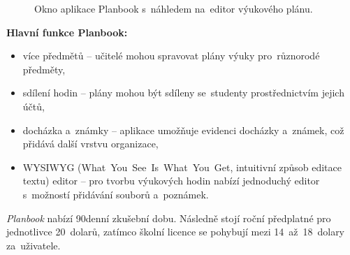 \documentclass[male,czech,api_bc]{kitheses}
\begin{document}
\begin{figure}[H]
	\centering
	\caption{Okno aplikace Planbook s~náhledem na~editor výukového plánu.}
	\label{fig:planbook-2}
\end{figure}

\textbf{Hlavní funkce Planbook:}
\begin{itemize}
	\item více předmětů – učitelé mohou spravovat plány výuky pro~různorodé předměty,
	\item sdílení hodin – plány mohou být sdíleny se~studenty prostřednictvím jejich účtů,
	\item docházka a~známky – aplikace umožňuje evidenci docházky a~známek, což přidává další vrstvu organizace,
	\item WYSIWYG (What~You~See~Is~What~You~Get, intuitivní způsob editace textu) editor – pro tvorbu výukových hodin nabízí jednoduchý editor s~možností přidávání souborů a~poznámek.
\end{itemize}

\textit{Planbook} nabízí 90denní zkušební dobu. Následně stojí roční předplatné pro jednotlivce 20~dolarů, zatímco školní licence se pohybují mezi 14~až~18~dolary za~uživatele.
\end{document}
